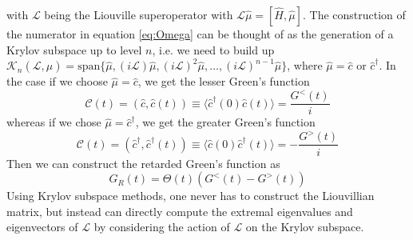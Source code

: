 with $\mathcal{L}$ being the Liouville superoperator with $\mathcal{L} \hat{{\mu}} = \left[ \hat{H}, \hat{{\mu}} \right]$. The construction of the numerator in equation \ref{eq:Omega} can be thought of as the generation of a Krylov subspace up to level $n$, i.e. we need to build up $\mathcal{K}_n(\mathcal{L}, \hat{{\mu}})= \text{span}\{\hat{{\mu}}, (i\mathcal{L})\hat{{\mu}}, (i\mathcal{L})^2\hat{{\mu}},\ldots, (i\mathcal{L})^{n-1}\hat{{\mu}}\}$, where $\hat{{\mu}} = \hat{c}$ or $\hat{c}^{\dagger}$. In the case if we choose $\hat{{\mu}}=\hat{c}$, we get the lesser Green's function 
\begin{equation}
\mathcal{C}(t) = (\hat{c}, \hat{c}(t)) \equiv \langle \hat{c}^{\dagger}(0)\hat{c}(t)\rangle = \frac{G^<(t)}{i}
\end{equation}
whereas if we chose $\hat{{\mu}}=\hat{c}^{\dagger}$, we get the greater Green's function 
\begin{equation}
\mathcal{C}(t) = (\hat{c}^{\dagger}, \hat{c}^{\dagger}(t)) \equiv \langle \hat{c}(0)\hat{c}^{\dagger}(t)\rangle = -\frac{G^>(t)}{i}
\end{equation}
Then we can construct the retarded Green's function as
\begin{equation}
    G_R(t) = \Theta(t) \left( G^<(t) - G^>(t) \right)
\end{equation}
Using Krylov subspace methods, one never has to construct the Liouvillian matrix, but instead can directly compute the extremal eigenvalues and eigenvectors of $\mathcal{L}$ by considering the action of $\mathcal{L}$ on the Krylov subspace.

